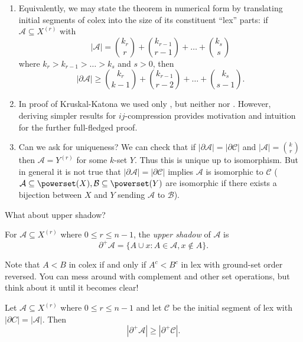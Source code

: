 \documentclass[a4paper]{article}
\newcommand{\shadow}{\partial}
\begin{document}
\begin{remark}\leavevmode
  \begin{enumerate}
  \item Equivalently, we may state the theorem in numerical form by translating initial segments of colex into the size of its constituent ``lex'' parts: if \(\mathcal A \subseteq X^{(r)}\) with
    \[
      |\mathcal A| = \binom{k_r}{r} + \binom{k_{r - 1}}{r - 1} + \dots + \binom{k_s}{s}
    \]
    where \(k_r > k_{r - 1} > \dots > k_s\) and \(s > 0\), then
    \[
      |\shadow \mathcal A| \geq \binom{k_r}{k - 1} + \binom{k_{r - 1}}{r - 2} + \dots + \binom{k_s}{s - 1}.
    \]
  \item In proof of Kruskal-Katona we used only , but neither  nor . However, deriving simpler results for \(ij\)-compression provides motivation and intuition for the further full-fledged proof.
  \item Can we ask for uniqueness? We can check that if \(|\shadow \mathcal A| = |\shadow \mathcal C|\) and \(|\mathcal A| = \binom{k}{r}\) then \(\mathcal A = Y^{(r)}\) for some \(k\)-set \(Y\). Thus this is unique up to isomorphism. But in general it is not true that \(|\shadow \mathcal A| = |\shadow \mathcal C|\) implies \(\mathcal A\) is isomorphic to \(\mathcal C\) (\(\mathcal A \subseteq \powerset(X), \mathcal B \subseteq \powerset(Y)\) are isomorphic if there exists a bijection between \(X\) and \(Y\) sending \(\mathcal A\) to \(\mathcal B\)).
  \end{enumerate}
\end{remark}

What about upper shadow?

\begin{definition}
  For \(\mathcal A \subseteq X^{(r)}\) where \(0 \leq r \leq n - 1\), the \emph{upper shadow} of \(\mathcal A\) is
  \[
    \shadow^+ \mathcal A = \{A \cup x: A \in \mathcal A, x \notin A\}.
  \]
\end{definition}

Note that \(A < B\) in colex if and only if \(A^c < B^c\) in lex with ground-set order reversed. You can mess around with complement and other set operations, but think about it until it becomes clear!

\begin{corollary}
  Let \(\mathcal A \subseteq X^{(r)}\) where \(0 \leq r \leq n - 1\) and let \(\mathcal C\) be the initial segment of lex with \(|\shadow C| = |\mathcal A|\). Then
  \[
    |\shadow^+ \mathcal A| \geq |\shadow^+ \mathcal C|.
  \]
\end{corollary}
\end{document}
